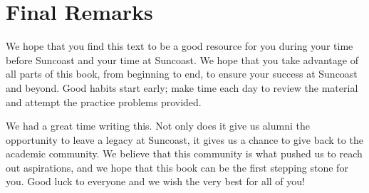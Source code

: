 \documentclass[../book.tex]{subfiles}
\begin{document}
\section{Final Remarks}
We hope that you find this text to be a good resource for you during your time before Suncoast and your time at Suncoast.  We hope that you take advantage of all parts of this book, from beginning to end, to ensure your success at Suncoast and beyond.  Good habits start early; make time each day to review the material and attempt the practice problems provided.  

We had a great time writing this.  Not only does it give us alumni the opportunity to leave a legacy at Suncoast, it gives us a chance to give back to the academic community.  We believe that this community is what pushed us to reach out aspirations, and we hope that this book can be the first stepping stone for you.  Good luck to everyone and we wish the very best for all of you!
\end{document}
